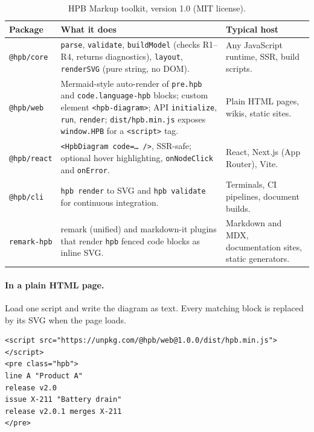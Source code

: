 \begin{table}[tbp]
  \centering
  \small
  \caption{HPB Markup toolkit, version 1.0 (MIT license).}
  \label{tab:packages}
  \renewcommand{\arraystretch}{1.12}
  \begin{tabularx}{\linewidth}{@{}>{\raggedright\arraybackslash}p{2.6cm}
      >{\raggedright\arraybackslash}X
      >{\raggedright\arraybackslash}p{3.5cm}@{}}
    \toprule
    \textbf{Package} & \textbf{What it does} & \textbf{Typical host} \\
    \midrule
    \texttt{@hpb/core}
      & \texttt{parse}, \texttt{validate}, \texttt{buildModel} (checks
        R1--R4, returns diagnostics), \texttt{layout}, \texttt{renderSVG}
        (pure string, no DOM).
      & Any JavaScript runtime, SSR, build scripts. \\
    \addlinespace
    \texttt{@hpb/web}
      & Mermaid-style auto-render of \texttt{pre.hpb} and
        \texttt{code.language-hpb} blocks; custom element
        \texttt{<hpb-diagram>}; API \texttt{initialize}, \texttt{run},
        \texttt{render}; \texttt{dist/hpb.min.js} exposes
        \texttt{window.HPB} for a \texttt{<script>} tag.
      & Plain HTML pages, wikis, static sites. \\
    \addlinespace
    \texttt{@hpb/react}
      & \texttt{<HpbDiagram code=\dots{} />}, SSR-safe; optional hover
        highlighting, \texttt{onNodeClick} and \texttt{onError}.
      & React, Next.js (App Router), Vite. \\
    \addlinespace
    \texttt{@hpb/cli}
      & \texttt{hpb render} to SVG and \texttt{hpb validate} for
        continuous integration.
      & Terminals, CI pipelines, document builds. \\
    \addlinespace
    \texttt{remark-hpb}
      & remark (unified) and markdown-it plugins that render
        \texttt{hpb} fenced code blocks as inline SVG.
      & Markdown and MDX, documentation sites, static generators. \\
    \bottomrule
  \end{tabularx}
\end{table}

\paragraph{In a plain HTML page.}
Load one script and write the diagram as text. Every matching block is
replaced by its SVG when the page loads.
\begin{lstlisting}[language=hpbplain]
<script src="https://unpkg.com/@hpb/web@1.0.0/dist/hpb.min.js"></script>
<pre class="hpb">
line A "Product A"
release v2.0
issue X-211 "Battery drain"
release v2.0.1 merges X-211
</pre>
\end{lstlisting}

